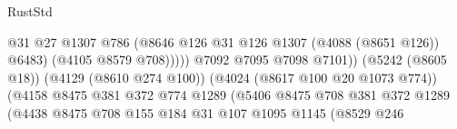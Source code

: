 \begin{lexlean}{RustStd}
\begin{coremodule}
                                                            @31
                                                            @27
                                                            @1307
                                                            @786
                                                            (@8646
                                                              @126
                                                              @31
                                                              @126
                                                              @1307
                                                              (@4088 (@8651 @126))
                                                              @6483)
                                                            (@4105 @8579 @708)))))
                                                    @7092
                                                    @7095
                                                    @7098
                                                    @7101))
                                                (@5242 (@8605 @18))
                                                (@4129 (@8610 @274 @100))
                                                (@4024 (@8617 @100 @20 @1073 @774))
                                                (@4158
                                                  @8475
                                                  @381
                                                  @372
                                                  @774
                                                  @1289
                                                  (@5406
                                                    @8475
                                                    @708
                                                    @381
                                                    @372
                                                    @1289
                                                    (@4438
                                                      @8475
                                                      @708
                                                      @155
                                                      @184
                                                      @31
                                                      @107
                                                      @1095
                                                      @1145
                                                      (@8529
                                                        @246

\end{coremodule}
\end{lexlean}
